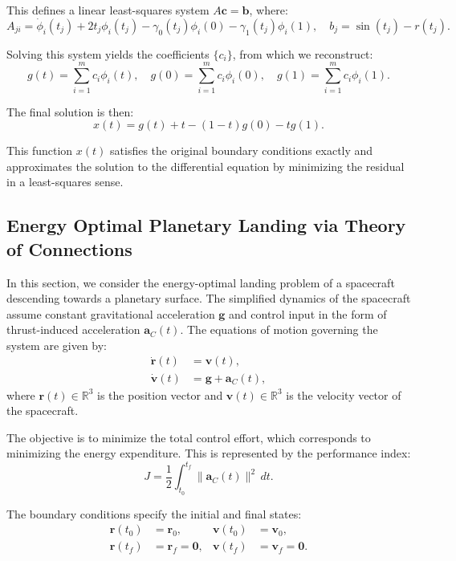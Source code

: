 This defines a linear least-squares system \( A\mathbf{c} = \mathbf{b} \), where:
\[
A_{ji} = \dot{\phi}_i(t_j) + 2t_j \phi_i(t_j) - \gamma_0(t_j)\phi_i(0) - \gamma_1(t_j)\phi_i(1),
\quad
b_j = \sin(t_j) - r(t_j).
\]

Solving this system yields the coefficients \( \{ c_i \} \), from which we reconstruct:
\[
g(t) = \sum_{i=1}^{m} c_i \phi_i(t),
\quad
g(0) = \sum_{i=1}^{m} c_i \phi_i(0),
\quad
g(1) = \sum_{i=1}^{m} c_i \phi_i(1).
\]

The final solution is then:
\[
x(t) = g(t) + t - (1 - t)g(0) - t g(1).
\]

This function \( x(t) \) satisfies the original boundary conditions exactly and approximates the solution to the differential equation by minimizing the residual in a least-squares sense.

\subsection{Energy Optimal Planetary Landing via Theory of Connections}
In this section, we consider the energy-optimal landing problem of a spacecraft descending towards a planetary surface. The simplified dynamics of the spacecraft assume constant gravitational acceleration $\mathbf{g}$ and control input in the form of thrust-induced acceleration $\mathbf{a}_C(t)$. The equations of motion governing the system are given by:
\begin{align}
    \dot{\mathbf{r}}(t) &= \mathbf{v}(t), \\
    \dot{\mathbf{v}}(t) &= \mathbf{g} + \mathbf{a}_C(t),
\end{align}
where $\mathbf{r}(t) \in \mathbb{R}^3$ is the position vector and $\mathbf{v}(t) \in \mathbb{R}^3$ is the velocity vector of the spacecraft.

The objective is to minimize the total control effort, which corresponds to minimizing the energy expenditure. This is represented by the performance index:
\begin{equation}
    J = \frac{1}{2} \int_{t_0}^{t_f} \|\mathbf{a}_C(t)\|^2 \, dt.
\end{equation}

The boundary conditions specify the initial and final states:
\begin{align}
    \mathbf{r}(t_0) &= \mathbf{r}_0, & \mathbf{v}(t_0) &= \mathbf{v}_0, \\
    \mathbf{r}(t_f) &= \mathbf{r}_f = \mathbf{0}, & \mathbf{v}(t_f) &= \mathbf{v}_f = \mathbf{0}.
\end{align}


